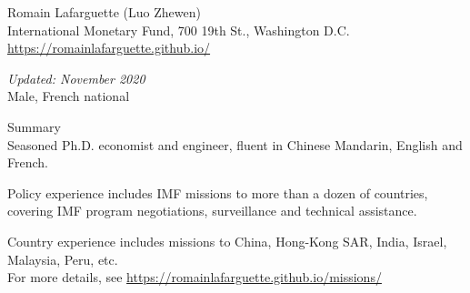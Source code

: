 \documentclass[usegeometry, 10pt, a4paper]{cv} %
\begin{document}
\hspace{15mm}
\begin{chapeau}
\begin{adresse}
\begin{flushleft}
    Romain Lafarguette (Luo Zhewen)\\
    International Monetary Fund, 700 19th St., Washington D.C.\\
    \url{https://romainlafarguette.github.io/} \\
\end{flushleft}
\end{adresse}
\begin{etatcivil}
\begin{flushleft}
  \emph{Updated: November 2020}\\
Male, French national
\end{flushleft}
\end{etatcivil}
\end{chapeau}


\begin{rubriquetableau}[0.95\textwidth]{Summary}\\
  \vspace{-0.3cm}
  \noindent Seasoned Ph.D. economist and engineer, fluent in Chinese Mandarin,
  English and French.\\

  \smallskip

\noindent Policy  experience includes  IMF missions  to more  than a  dozen of
countries,  covering  IMF  program negotiations,  surveillance  and  technical
assistance.\\

\smallskip

Country experience  includes  missions to  China, Hong-Kong  SAR,
India, Israel, Malaysia, Peru, etc.\\
For more details, see \url{https://romainlafarguette.github.io/missions/} \\

\end{rubriquetableau}

\vspace{0.5cm}
\end{document}
